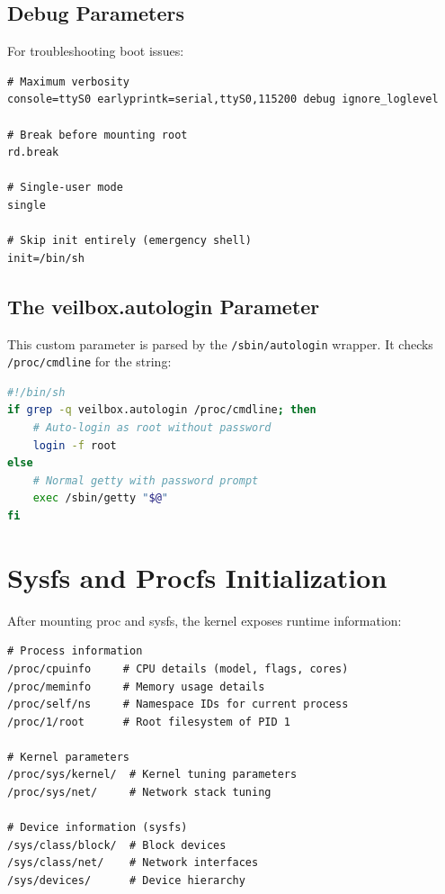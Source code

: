 \subsection{Debug Parameters}

For troubleshooting boot issues:

\begin{lstlisting}
# Maximum verbosity
console=ttyS0 earlyprintk=serial,ttyS0,115200 debug ignore_loglevel

# Break before mounting root
rd.break

# Single-user mode
single

# Skip init entirely (emergency shell)
init=/bin/sh
\end{lstlisting}

\subsection{The veilbox.autologin Parameter}

This custom parameter is parsed by the \texttt{/sbin/autologin} wrapper.
It checks \texttt{/proc/cmdline} for the string:

\begin{lstlisting}[language=bash]
#!/bin/sh
if grep -q veilbox.autologin /proc/cmdline; then
    # Auto-login as root without password
    login -f root
else
    # Normal getty with password prompt
    exec /sbin/getty "$@"
fi
\end{lstlisting}

\section{Sysfs and Procfs Initialization}

After mounting proc and sysfs, the kernel exposes runtime information:

\begin{lstlisting}
# Process information
/proc/cpuinfo     # CPU details (model, flags, cores)
/proc/meminfo     # Memory usage details
/proc/self/ns     # Namespace IDs for current process
/proc/1/root      # Root filesystem of PID 1

# Kernel parameters
/proc/sys/kernel/  # Kernel tuning parameters
/proc/sys/net/     # Network stack tuning

# Device information (sysfs)
/sys/class/block/  # Block devices
/sys/class/net/    # Network interfaces
/sys/devices/      # Device hierarchy
\end{lstlisting}
